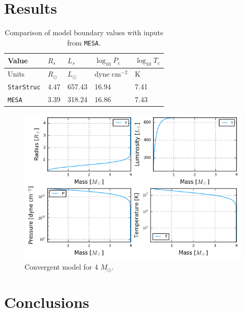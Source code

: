 \documentclass[onecolumn]{article}
\begin{document}
\section{Results}

\begin{table}[h]
  \centering
  \begin{tabular}{lllll}
    Value & $R_s$ & $L_s$ & $\log_{10} P_c$ & $\log_{10} T_c$ \\
    \toprule
    Units & $R_\odot$ & $L_\odot$ & dyne cm$^{-2}$ & K \\
    \midrule
    \texttt{StarStruc} & 4.47 & 657.43 & 16.94 & 7.41 \\
    \texttt{MESA} & 3.39 & 318.24 & 16.86 & 7.43 \\
    \bottomrule
  \end{tabular}
  \caption{Comparison of model boundary values with inputs from \texttt{MESA}.}
\end{table}

\begin{figure}[h]
  \centering
  \includegraphics[width=0.9\linewidth]{mstar4.png}
  \caption{Convergent model for 4 $M_\odot$.}
\end{figure}
\section{Conclusions}
\end{document}
